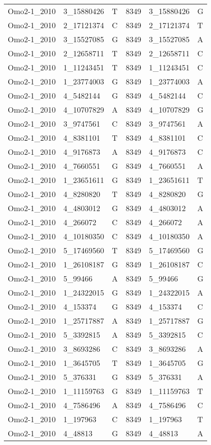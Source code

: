 \begin{center}
\begin{longtable}{|l|l|l|l|l|l|}
Omo2-1\_2010&3\_15880426&T&8349&3\_15880426&G\\
Omo2-1\_2010&2\_17121374&C&8349&2\_17121374&T\\
Omo2-1\_2010&3\_15527085&G&8349&3\_15527085&A\\
Omo2-1\_2010&2\_12658711&T&8349&2\_12658711&C\\
Omo2-1\_2010&1\_11243451&T&8349&1\_11243451&C\\
Omo2-1\_2010&1\_23774003&G&8349&1\_23774003&A\\
Omo2-1\_2010&4\_5482144&G&8349&4\_5482144&C\\
Omo2-1\_2010&4\_10707829&A&8349&4\_10707829&G\\
Omo2-1\_2010&3\_9747561&C&8349&3\_9747561&A\\
Omo2-1\_2010&4\_8381101&T&8349&4\_8381101&C\\
Omo2-1\_2010&4\_9176873&A&8349&4\_9176873&C\\
Omo2-1\_2010&4\_7660551&G&8349&4\_7660551&A\\
Omo2-1\_2010&1\_23651611&G&8349&1\_23651611&T\\
Omo2-1\_2010&4\_8280820&T&8349&4\_8280820&G\\
Omo2-1\_2010&4\_4803012&G&8349&4\_4803012&A\\
Omo2-1\_2010&4\_266072&C&8349&4\_266072&A\\
Omo2-1\_2010&4\_10180350&C&8349&4\_10180350&A\\
Omo2-1\_2010&5\_17469560&T&8349&5\_17469560&G\\
Omo2-1\_2010&1\_26108187&G&8349&1\_26108187&C\\
Omo2-1\_2010&5\_99466&A&8349&5\_99466&G\\
Omo2-1\_2010&1\_24322015&G&8349&1\_24322015&A\\
Omo2-1\_2010&4\_153374&G&8349&4\_153374&C\\
Omo2-1\_2010&1\_25717887&A&8349&1\_25717887&G\\
Omo2-1\_2010&5\_3392815&A&8349&5\_3392815&C\\
Omo2-1\_2010&3\_8693286&C&8349&3\_8693286&A\\
Omo2-1\_2010&1\_3645705&T&8349&1\_3645705&G\\
Omo2-1\_2010&5\_376331&G&8349&5\_376331&A\\
Omo2-1\_2010&1\_11159763&G&8349&1\_11159763&T\\
Omo2-1\_2010&4\_7586496&A&8349&4\_7586496&C\\
Omo2-1\_2010&1\_197963&C&8349&1\_197963&T\\
Omo2-1\_2010&4\_48813&G&8349&4\_48813&A\\

\end{longtable}
\end{center}
